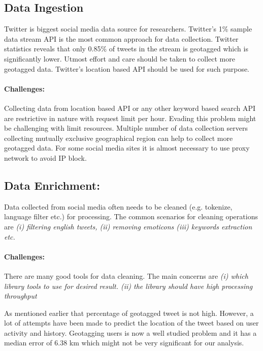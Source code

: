 \subsection{Data Ingestion}
Twitter is biggest social media data source for researchers. Twitter's 1\% sample data stream API is the most common approach for data collection. Twitter statistics reveals that only 0.85\% of tweets in the stream is geotagged \cite{sloan2013knowing} which is significantly lower. Utmost effort and care should be taken to collect more geotagged data. Twitter's location based API should be used for such purpose.

\paragraph{Challenges:}
Collecting data from location based API or any other keyword based search API are restrictive in nature with request limit per hour.
Evading this problem might be challenging with limit resources. Multiple number of data collection servers collecting mutually exclusive geographical region can help to collect more geotagged data. For some social media sites it is almost necessary to use proxy network to avoid IP block.

\subsection{Data Enrichment:}
Data collected from social media often needs to be cleaned (e.g. tokenize, language filter etc.) for processing. The common scenarios for cleaning operations are {\em(i) filtering english tweets, (ii) removing emoticons (iii) keywords extraction etc. }

\vspace{-2mm}
\paragraph{Challenges:} There are many good tools for data cleaning. The main concerns are {\em(i) which library tools to use for desired result. (ii) the library should have high processing throughput}

As mentioned earlier that percentage of geotagged tweet is not high. However, a lot of attempts have been made to predict the location of the tweet based on user activity and history.  Geotagging users is now a well studied problem and it has a median error of 6.38 km which might not be very significant for our analysis\cite{compton2014geotagging}.

